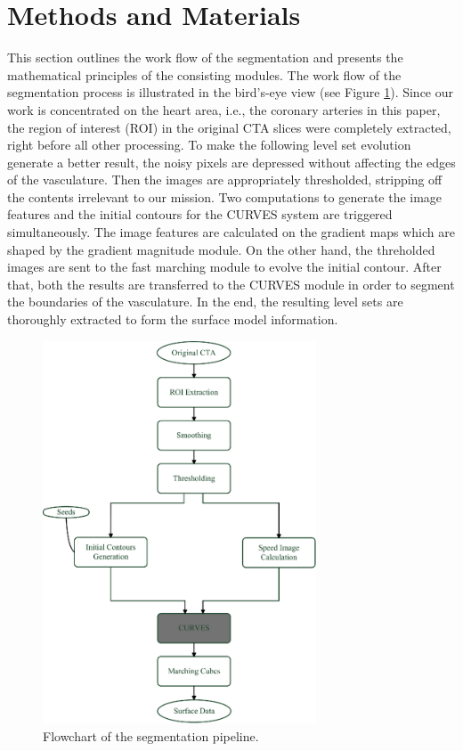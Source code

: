 \section{Methods and Materials}
\label{sec:coronary_methods}

This section outlines the work flow of the segmentation and presents the mathematical principles of the consisting modules.
The work flow of the segmentation process is illustrated in the bird's-eye view (see Figure \ref{fig:coronary_data_flow}).
Since our work is concentrated on the heart area, i.e., the coronary arteries in this paper, the region of interest (ROI) in the original CTA slices were completely extracted, right before all other processing. %
To make the following level set evolution generate a better result, the noisy pixels are depressed without affecting the edges of the vasculature.
Then the images are appropriately thresholded, stripping off the contents irrelevant to our mission.
Two computations to generate the image features and the initial contours for the CURVES system are triggered simultaneously.
The image features are calculated on the gradient maps which are shaped by the gradient magnitude module.
On the other hand, the threholded images are sent to the fast marching module to evolve the initial contour.
After that, both the results are transferred to the CURVES module in order to segment the boundaries of the vasculature.
In the end, the resulting level sets are thoroughly extracted to form the surface model information.
\begin{figure}[tb]
\centering
\includegraphics[width=3.2in]{Figures/coronary/DataFlow}
\caption{Flowchart of the segmentation pipeline.}
\label{fig:coronary_data_flow}
\end{figure}

